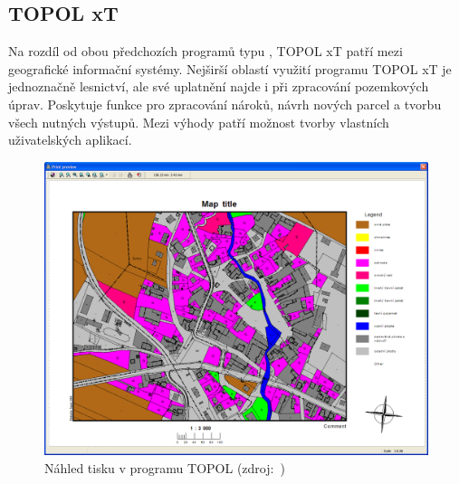\subsection{TOPOL xT}
\label{topol_xt}

Na rozdíl od obou předchozích programů typu , TOPOL xT \citep{topol} patří mezi geografické informační systémy. Nejširší oblastí využití programu TOPOL xT je jednoznačně lesnictví, ale své uplatnění najde i při zpracování pozemkových úprav. Poskytuje funkce pro zpracování nároků, návrh nových parcel a tvorbu všech nutných výstupů. Mezi výhody patří možnost tvorby vlastních uživatelských aplikací.

	\begin{figure}[H]
		\centering
		\includegraphics[width=.8\textwidth]{./pictures/topol.png}
		\caption[Náhled tisku v programu TOPOL]{Náhled tisku v programu TOPOL (zdroj:~\citep{topol})}
		\label{fig:topol_obrazek}
 	\end{figure}